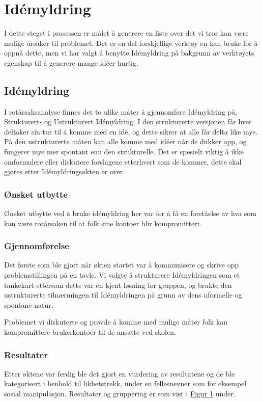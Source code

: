 \chapter{Idémyldring}
I dette steget i prosessen er målet å generere en liste over det vi tror kan være mulige årsaker til problemet. Det er en del forskjellige verktøy en kan bruke for å oppnå dette, men vi har valgt å benytte Idémyldring på bakgrunn av verktøyets egenskap til å generere mange idéer hurtig.

\section{Idémyldring}
I rotårsaksanalyse finnes det to ulike måter å gjennomføre Idémyldring på, Strukturert- og Ustrukturert Idémyldring. I den strukturerte versjonen får hver deltaker sin tur til å komme med en idé, og dette sikrer at alle får delta like mye. På den ustrukturerte måten kan alle komme med idéer når de dukker opp, og fungerer mye mer spontant enn den strukturelle. Det er spesielt viktig å ikke omformulere eller diskutere forslagene etterhvert som de kommer, dette skal gjøres etter Idémyldringsøkten er over.

\subsection{Ønsket utbytte}
Ønsket utbytte ved å bruke idémyldring her var for å få en forståelse av hva som kan være rotårsaken til at folk sine kontoer blir kompromittert.

\subsection{Gjennomførelse}
Det første som ble gjort når økten startet var å kommunisere og skrive opp problemstillingen på en tavle. Vi valgte å strukturere Idémyldringen som et tankekart ettersom dette var en kjent løsning for gruppen, og brukte den ustrukturerte tilnærmingen til Idémyldringen på grunn av dens uformelle og spontane natur. 

Problemet vi diskuterte og prøvde å komme med mulige måter folk kan kompromittere brukerkontoer til de ansatte ved skolen.

\subsection{Resultater}
Etter øktene var ferdig ble det gjort en vurdering av resultatene og de ble kategorisert i henhold til likhetstrekk, under en fellesnevner som for eksempel sosial manipulasjon. Resultater og gruppering er som vist i \hyperref[fig:idemyldring]{Figur 1} under.

